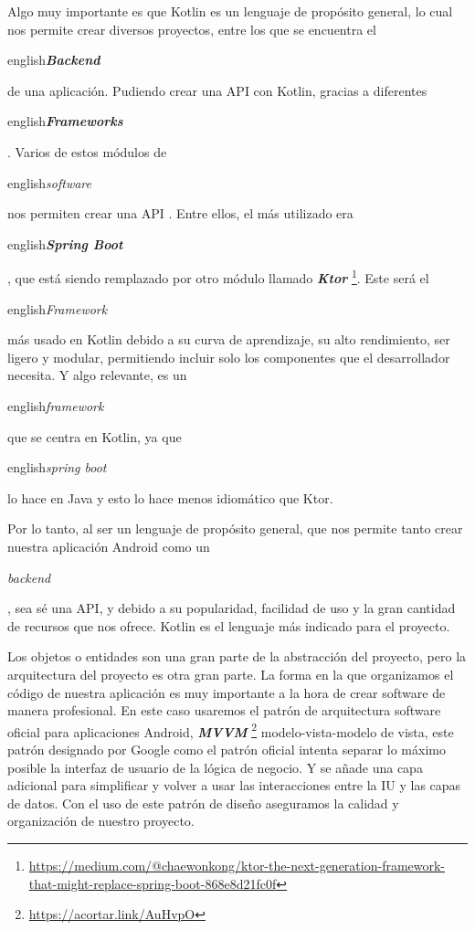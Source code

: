 Algo muy importante es que Kotlin es un lenguaje de propósito general, lo cual nos permite crear 
diversos proyectos, entre los que se encuentra el \begin{otherlanguage}
{english}\textit{\textbf{Backend}}\end{otherlanguage} de una aplicación. Pudiendo crear una API 
 con Kotlin, gracias a diferentes \begin{otherlanguage}
{english}\textit{\textbf{Frameworks}}\end{otherlanguage} \cite{FrameWrk}. Varios de estos módulos de 
\begin{otherlanguage} {english}\textit{software}\end{otherlanguage} nos permiten crear una API 
. Entre ellos, el más utilizado era \begin{otherlanguage}
{english}\textbf{\textit{Spring Boot}}\end{otherlanguage}, que está siendo remplazado por otro módulo 
llamado \textbf{\textit{Ktor}} \footnote{\url{https://medium.com/@chaewonkong/ktor-the-next-generation-framework-that-might-replace-spring-boot-868e8d21fc0f}}. Este será el \begin{otherlanguage}
{english}\textit{Framework}\end{otherlanguage} más usado en Kotlin debido a su curva de aprendizaje, su 
alto rendimiento, ser ligero y modular, permitiendo incluir solo los componentes que el desarrollador 
necesita. Y algo relevante, es un \begin{otherlanguage}
{english}\textit{framework}\end{otherlanguage} que se centra en Kotlin, ya que \begin{otherlanguage}
{english}\textit{spring boot}\end{otherlanguage} lo hace en Java y esto lo hace menos idiomático que 
Ktor.

Por lo tanto, al ser un lenguaje de propósito general, que nos permite tanto crear nuestra aplicación 
Android como un \begin{otherlanguage}{english}\textit{backend}\end{otherlanguage}, sea sé una API, y 
debido a su popularidad, facilidad de uso y la gran cantidad de recursos que nos ofrece. Kotlin 
es el lenguaje más indicado para el proyecto.

Los objetos o entidades son una gran parte de la abstracción del proyecto, pero la arquitectura del 
proyecto es otra gran parte. La forma en la que organizamos el código de nuestra aplicación es muy 
importante \cite{ArqSoft} a la hora de crear software de manera profesional. En este caso usaremos el 
patrón de arquitectura software oficial para aplicaciones Android, \textbf{\textit{MVVM}}  
\footnote{\url{https://acortar.link/AuHvpO}} modelo-vista-modelo de vista, este patrón designado por 
Google como el patrón oficial intenta separar lo máximo posible la interfaz de usuario de la lógica de 
negocio. Y se añade una capa adicional para simplificar y volver a usar las interacciones entre la IU y 
las capas de datos. Con el uso de este patrón de diseño aseguramos la calidad y organización de nuestro 
proyecto.

